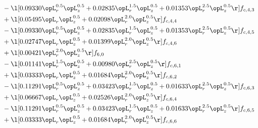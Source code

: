 \begin{alignat}{2}
& - \l[  0.09330 \opL_r^{0.5} \opL_z^{0.5} +  0.02835 \opL_r^{1.5} \opL_z^{0.5} +  0.01353 \opL_r^{2.5} \opL_z^{0.5}  \r] f_{c,4,3} \nonumber \\ 
& + \l[  0.05495 \opL_r \opL_z^{0.5} +  0.02098 \opL_r^{2.0} \opL_z^{0.5}  \r] f_{c,4,4} \nonumber \\ 
& - \l[  0.09330 \opL_r^{0.5} \opL_z^{0.5} +  0.02835 \opL_r^{1.5} \opL_z^{0.5} +  0.01353 \opL_r^{2.5} \opL_z^{0.5}  \r] f_{c,4,5} \nonumber \\ 
& + \l[  0.02747 \opL_r \opL_z^{0.5} +  0.01399 \opL_r^{2.0} \opL_z^{0.5}  \r] f_{c,4,6} \nonumber \\ 
& + \l[  0.00421 \opL_r^{2.0} \opL_z^{0.5}  \r] f_{6,0} \nonumber \\ 
& - \l[  0.01141 \opL_r^{1.5} \opL_z^{0.5} +  0.00980 \opL_r^{2.5} \opL_z^{0.5}  \r] f_{c,6,1} \nonumber \\ 
& + \l[  0.03333 \opL_r \opL_z^{0.5} +  0.01684 \opL_r^{2.0} \opL_z^{0.5}  \r] f_{c,6,2} \nonumber \\ 
& - \l[  0.11291 \opL_r^{0.5} \opL_z^{0.5} +  0.03423 \opL_r^{1.5} \opL_z^{0.5} +  0.01633 \opL_r^{2.5} \opL_z^{0.5}  \r] f_{c,6,3} \nonumber \\ 
& + \l[  0.06667 \opL_r \opL_z^{0.5} +  0.02526 \opL_r^{2.0} \opL_z^{0.5}  \r] f_{c,6,4} \nonumber \\ 
& - \l[  0.11291 \opL_r^{0.5} \opL_z^{0.5} +  0.03423 \opL_r^{1.5} \opL_z^{0.5} +  0.01633 \opL_r^{2.5} \opL_z^{0.5}  \r] f_{c,6,5} \nonumber \\ 
& + \l[  0.03333 \opL_r \opL_z^{0.5} +  0.01684 \opL_r^{2.0} \opL_z^{0.5}  \r] f_{c,6,6} \nonumber \\ 
\end{alignat} 



